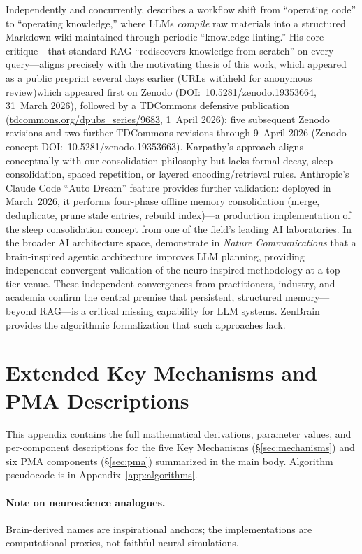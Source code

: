 \documentclass{article}
\makeatletter
\newcommand{\anon}[2]{\if@anonymous #2\else #1\fi}
\makeatother
\begin{document}
Independently and concurrently, \citet{karpathy2026knowledge} describes
a workflow shift from ``operating code'' to ``operating knowledge,''
where LLMs \emph{compile} raw materials into a structured Markdown wiki
maintained through periodic ``knowledge linting.''
His core critique---that standard RAG ``rediscovers knowledge from scratch''
on every query---aligns precisely with the motivating thesis of this work,
\anon{which appeared first on Zenodo
(DOI:~10.5281/zenodo.19353664, 31~March 2026), followed by a
TDCommons defensive publication (\url{tdcommons.org/dpubs_series/9683},
1~April 2026); five subsequent Zenodo revisions and two further
TDCommons revisions through 9~April 2026 (Zenodo concept
DOI:~10.5281/zenodo.19353663)}{which appeared as a public preprint
several days earlier (URLs withheld for anonymous review)}.
Karpathy's approach aligns conceptually with our consolidation
philosophy but lacks formal decay, sleep consolidation, spaced
repetition, or layered encoding/retrieval rules.
Anthropic's Claude Code ``Auto Dream'' feature \citep{anthropic2026autodream}
provides further validation: deployed in March~2026, it performs four-phase
offline memory consolidation (merge, deduplicate, prune stale entries,
rebuild index)---a production implementation of the sleep consolidation
concept from one of the field's leading AI laboratories.
In the broader AI architecture space, \citet{webb2025brain} demonstrate
in \emph{Nature Communications} that a brain-inspired agentic architecture
improves LLM planning, providing independent convergent validation of
the neuro-inspired methodology at a top-tier venue.
These independent convergences from practitioners, industry, and
academia confirm the central premise that persistent, structured
memory---beyond RAG---is a critical missing capability for LLM systems.
ZenBrain provides the algorithmic formalization that such approaches lack.


\section{Extended Key Mechanisms and PMA Descriptions}
\label{app:extended-mechanisms}

This appendix contains the full mathematical derivations, parameter
values, and per-component descriptions for the five Key Mechanisms
(\S\ref{sec:mechanisms}) and six PMA components (\S\ref{sec:pma})
summarized in the main body. Algorithm pseudocode is in
Appendix~\ref{app:algorithms}.

\paragraph{Note on neuroscience analogues.} Brain-derived names are
inspirational anchors; the implementations are computational proxies,
not faithful neural simulations.
\end{document}
